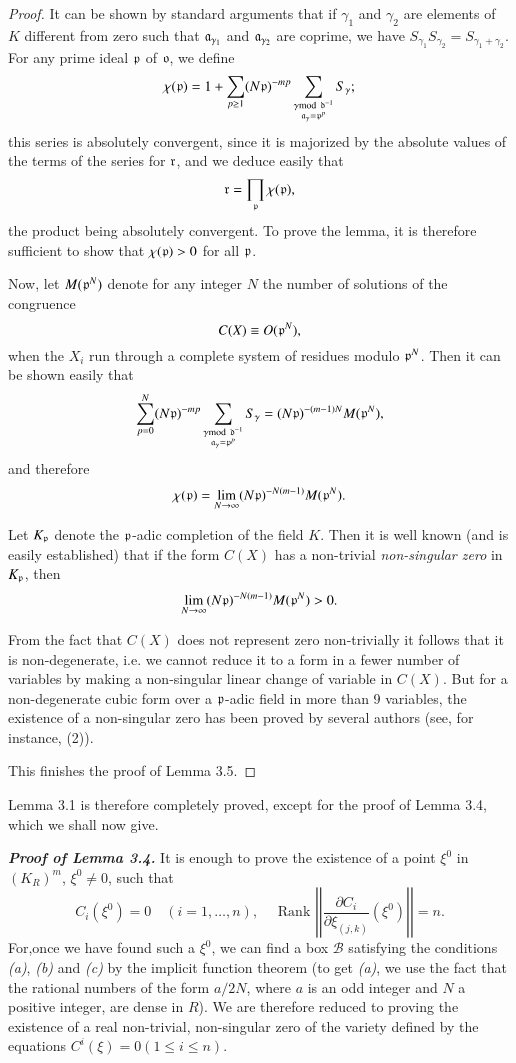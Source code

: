 \begin{proof}
It can be shown by standard arguments that if $\gamma_1$ and $\gamma_2$ are elements of $K$ different from zero such that $\mathfrak{a}_{\gamma_1}$ and $\mathfrak{a}_{\gamma_2}$ are coprime, we have $S_{\gamma_1} S_{\gamma_2} = S_{\gamma_1 + \gamma_2}$. For any prime ideal $\mathfrak{p}$ of $\mathfrak{o}$, we define
$$
\chi (\mathfrak{p}) = 1 + \sum\limits_{p \geq 1} (N\mathfrak{p})^{-mp} \sum\limits_{\substack{\gamma {\rm{mod}}\kern.3em \mathfrak{d}^{-1} \\ \mathfrak{a}_\gamma = \mathfrak{p}^p}} S_\gamma;
$$
this series is absolutely convergent, since it is majorized by the absolute values of the terms of the series for $\mathfrak{r}$, and we deduce easily that
$$
\mathfrak{r} = \prod\limits_{\mathfrak{p}} \chi (\mathfrak{p}),
$$
the product being absolutely convergent. To prove the lemma, it is therefore sufficient to show that $\chi (\mathfrak{p}) >0$ for all $\mathfrak{p}$.

Now, let $M(\mathfrak{p}^{N})$ denote for any integer $N$ the number of solutions of the congruence
$$
C(X) \equiv O (\mathfrak{p}^N),
$$
when the $X_i$ run through a complete system of residues modulo $\mathfrak{p}^N$. Then it can be shown easily that
$$
\sum\limits^N_{p=0} (N\mathfrak{p})^{-mp} \sum\limits_{\substack{\gamma {\rm{mod}}\kern.3em \mathfrak{d}^{-1}\\ \mathfrak{a}_\gamma = \mathfrak{p}^p}} S_\gamma = (N\mathfrak{p})^{-(m-1)N} M (\mathfrak{p}^N),
$$
and therefore 
$$
\chi(\mathfrak{p}) = \lim\limits_{N \to \infty} (N \mathfrak{p})^{-N(m-1)} M(\mathfrak{p}^N).
$$

Let $K_{\mathfrak{p}}$ denote the $\mathfrak{p}$-adic completion of the field $K$. Then it is well known (and is easily established) that if the form $C(X)$ has a non-trivial {\em non-singular zero} in $K_{\mathfrak{p}}$, then 
$$
\lim\limits_{N\to \infty} (N\mathfrak{p})^{-N(m-1)} M (\mathfrak{p}^N)>0.
$$

From the fact that $C(X)$ does not represent zero non-trivially it follows that it is non-degenerate, i.e. we cannot reduce it to a form in a fewer number of variables by making a non-singular linear change of variable in $C(X)$. But for a non-degenerate cubic form over a $\mathfrak{p}$-adic field in more than 9 variables, the existence of a non-singular zero has been proved by several authors (see, for instance, (2)).

This finishes the proof of Lemma 3.5.
\end{proof}

Lemma 3.1 is therefore completely proved, except for the proof of Lemma 3.4, which we shall now give.

\noindent
{\bf \em Proof of Lemma 3.4.} It is enough to prove the existence of a point $\xi^0$ in $(K_R)^m$, $\xi^0 \neq 0$, such that 
$$
C_i (\xi^0) =0 \quad (i = 1,\ldots, n), \quad \text{ Rank } \left|\left|\frac{\partial C_i}{\partial \xi_{(j,k)}} (\xi^0) \right|\right| = n.
$$
For,\pageoriginale once we have found such a $\xi^0$, we can find a box $\mathscr{B}$ satisfying the conditions \textit{(a)}, \textit{(b)} and \textit{(c)} by the implicit function theorem (to get \textit{(a)}, we use the fact that the rational numbers of the form $a/2N$, where $a$ is an odd integer and $N$ a positive integer, are dense in $R$). We are therefore reduced to proving the existence of a real non-trivial, non-singular zero of the variety defined by the equations $C^i(\xi) =0 (1 \leq i \leq n)$.

